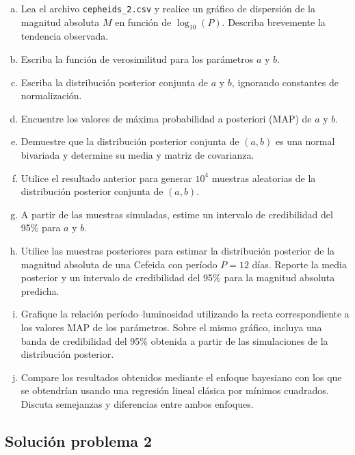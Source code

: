 \documentclass[12pt]{article}
\begin{document}
\begin{enumerate}[a)]
    \item Lea el archivo \texttt{cepheids\_2.csv} y realice un gráfico de dispersión de la magnitud absoluta $M$ en función de $\log_{10}(P)$. Describa brevemente la tendencia observada.
    
    \item Escriba la función de verosimilitud para los parámetros $a$ y $b$.
    
    \item Escriba la distribución posterior conjunta de $a$ y $b$, ignorando constantes de normalización.
    
    \item Encuentre los valores de máxima probabilidad a posteriori (MAP) de $a$ y $b$.
    
    \item Demuestre que la distribución posterior conjunta de $(a, b)$ es una normal bivariada y determine su media y matriz de covarianza.
    
    \item Utilice el resultado anterior para generar $10^4$ muestras aleatorias de la distribución posterior conjunta de $(a, b)$.
    
    \item A partir de las muestras simuladas, estime un intervalo de credibilidad del 95\% para $a$ y $b$.
    
    \item Utilice las muestras posteriores para estimar la distribución posterior de la magnitud absoluta de una Cefeida con período $P = 12$ días. Reporte la media posterior y un intervalo de credibilidad del 95\% para la magnitud absoluta predicha.
    
    \item Grafique la relación período--luminosidad utilizando la recta correspondiente a los valores MAP de los parámetros. Sobre el mismo gráfico, incluya una banda de credibilidad del 95\% obtenida a partir de las simulaciones de la distribución posterior.
    
    \item Compare los resultados obtenidos mediante el enfoque bayesiano con los que se obtendrían usando una regresión lineal clásica por mínimos cuadrados. Discuta semejanzas y diferencias entre ambos enfoques.
\end{enumerate}


\subsection{Solución problema 2}
\end{document}
